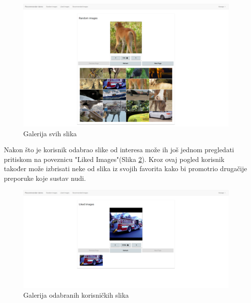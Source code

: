 \documentclass[times, utf8, proizvoljni, numeric]{fer}
\begin{document}
\begin{figure}[!ht]
	\begin{center}
		\captionsetup{justification=centering}
		\includegraphics[width=1.0\textwidth]{./imgs/demo-preporucitelja-po-sadrzaju/tijek-rada/demo-rand.png}
		\caption{Galerija svih slika}
		\label{fg:demo_rand}
	\end{center}
\end{figure}


Nakon što je korisnik odabrao slike od interesa može ih još jednom pregledati pritiskom na poveznicu "Liked Images"(Slika \ref{fg:demo_liked}). Kroz ovaj pogled korisnik također može izbrisati neke od slika iz svojih favorita kako bi promotrio drugačije preporuke koje sustav nudi.

\begin{figure}[H]
	\begin{center}
		\captionsetup{justification=centering}
		\includegraphics[width=1.0\textwidth]{./imgs/demo-preporucitelja-po-sadrzaju/tijek-rada/demo-liked.png}
		\caption{Galerija odabranih korisničkih slika}
		\label{fg:demo_liked}
	\end{center}
\end{figure}
\end{document}
